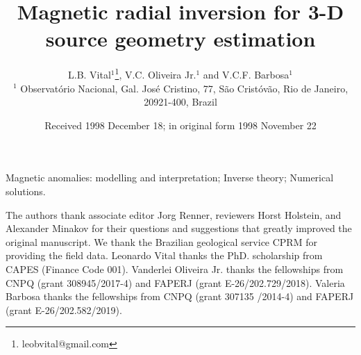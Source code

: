 \documentclass[extra,mreferee]{gji}
\title[Geophys.\ J.\ Int.: Magnetic radial inversion]
  {Magnetic radial inversion for 3-D source geometry estimation}
\author[L.B. Vital, V.C. Oliveira Jr. and V.C.F. Barbosa]
  {L.B. Vital$^1$\thanks{leobvital@gmail.com}, 
  V.C. Oliveira Jr.$^1$ and V.C.F. Barbosa$^1$\\
  $^1$ Observat{\'o}rio Nacional, Gal. Jos{\'e} Cristino, 77, São Crist{\'o}v{\~a}o,
  Rio de Janeiro, 20921-400, Brazil
  }
\date{Received 1998 December 18; in original form 1998 November 22}
\begin{document}
\label{firstpage}

\maketitle



\begin{keywords}
 Magnetic anomalies: modelling and interpretation; Inverse theory; Numerical solutions.
\end{keywords}











\begin{acknowledgments}
The authors thank associate editor Jorg Renner, reviewers Horst Holstein, and Alexander Minakov 
for their questions and suggestions that greatly improved the original manuscript.	
We thank the Brazilian geological service CPRM for providing the field data. 
Leonardo Vital thanks the PhD. scholarship from CAPES (Finance Code 001). 
Vanderlei Oliveira Jr. thanks the fellowships from CNPQ (grant 308945/2017-4) and 
FAPERJ (grant E-26/202.729/2018).  
Valeria Barbosa thanks the fellowships from CNPQ (grant 307135 /2014-4) and 
FAPERJ (grant E-26/202.582/2019).
\end{acknowledgments}






\appendix

\label{lastpage}
\end{document}
